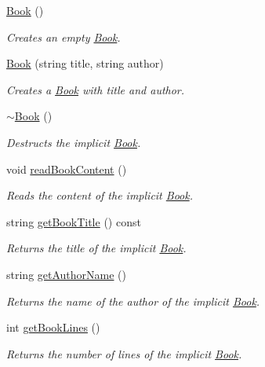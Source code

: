 \begin{DoxyCompactItemize}
\item 
\hyperlink{class_book_a2eac9e235a08763158f78533f7a83e1f}{Book} ()
\begin{DoxyCompactList}\small\item\em Creates an empty \hyperlink{class_book}{Book}. \end{DoxyCompactList}\item 
\hyperlink{class_book_a98dad89c9f945e0d846c81ce7e459fbc}{Book} (string title, string author)
\begin{DoxyCompactList}\small\item\em Creates a \hyperlink{class_book}{Book} with title and author. \end{DoxyCompactList}\item 
\hyperlink{class_book_a0ba8eceb34ea1301bc08942e37824767}{$\sim$\+Book} ()
\begin{DoxyCompactList}\small\item\em Destructs the implicit \hyperlink{class_book}{Book}. \end{DoxyCompactList}\item 
void \hyperlink{class_book_a3e62d70f19bf6fa8ebef5556882b3ed7}{read\+Book\+Content} ()
\begin{DoxyCompactList}\small\item\em Reads the content of the implicit \hyperlink{class_book}{Book}. \end{DoxyCompactList}\item 
string \hyperlink{class_book_aae6e165b712f111beb53574cd2f53776}{get\+Book\+Title} () const 
\begin{DoxyCompactList}\small\item\em Returns the title of the implicit \hyperlink{class_book}{Book}. \end{DoxyCompactList}\item 
string \hyperlink{class_book_a651503f226fbf2c9c050f9527a3b983e}{get\+Author\+Name} ()
\begin{DoxyCompactList}\small\item\em Returns the name of the author of the implicit \hyperlink{class_book}{Book}. \end{DoxyCompactList}\item 
int \hyperlink{class_book_a8f241d57fb5525e3008b3f3d6ba81291}{get\+Book\+Lines} ()
\begin{DoxyCompactList}\small\item\em Returns the number of lines of the implicit \hyperlink{class_book}{Book}. \end{DoxyCompactList}\item 

\end{DoxyCompactItemize}
